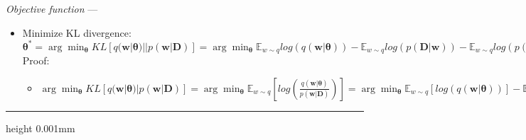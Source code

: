 \emph{Objective function} --- 
\begin{itemize}
    \item Minimize KL divergence: $\boldsymbol{\theta}^* = \arg\min_{\boldsymbol{\theta}} KL [ q(\boldsymbol{w}|\boldsymbol{\theta}) || p(\boldsymbol{w}|\boldsymbol{D}) ] = \arg\min_{\boldsymbol{\theta}} \mathbb{E}_{w \sim q} log (q(\boldsymbol{w}|\boldsymbol{\theta})) - \mathbb{E}_{w \sim q} log (p(\boldsymbol{D}|\boldsymbol{w})) - \mathbb{E}_{w \sim q} log (p(\boldsymbol{w}))$\\
    Proof:
    \begin{itemize}
        \item $\arg\min_{\boldsymbol{\theta}} KL [ q(\boldsymbol{w}|\boldsymbol{\theta}) | p(\boldsymbol{w}|\boldsymbol{D}) ] = \arg\min_{\boldsymbol{\theta}} \mathbb{E}_{w \sim q} [ log( \frac{q(\boldsymbol{w}|\boldsymbol{\theta})}{p(\boldsymbol{w}|\boldsymbol{D})} ) ] = \arg\min_{\boldsymbol{\theta}} \mathbb{E}_{w \sim q}[log( q(\boldsymbol{w}|\boldsymbol{\theta}) )] - \mathbb{E}_{w \sim q}[log( p(\boldsymbol{w}|\boldsymbol{D}) )] = \arg\min_{\boldsymbol{\theta}} \mathbb{E}_{w \sim q}[log( q(\boldsymbol{w}|\boldsymbol{\theta}) )] - \mathbb{E}_{w \sim q}[ \frac{p(\boldsymbol{D}|\boldsymbol{w}) \times p(\boldsymbol{w})}{ p(\boldsymbol{D}) } ] = \arg\min_{\boldsymbol{\theta}} \mathbb{E}_{w \sim q}log( q(\boldsymbol{w}|\boldsymbol{\theta}) ) - \mathbb{E}_{w \sim q} log (p(\boldsymbol{D}|\boldsymbol{w})) - \mathbb{E}_{w \sim q} log (p(\boldsymbol{w})) + \mathbb{E}_{w \sim q} log (p(\boldsymbol{D})) = \arg\min_{\boldsymbol{\theta}} \mathbb{E}_{w \sim q}log( q(\boldsymbol{w}|\boldsymbol{\theta}) ) - \mathbb{E}_{w \sim q} log (p(\boldsymbol{D}|\boldsymbol{w})) - \mathbb{E}_{w \sim q} log (p(\boldsymbol{w})) + \textrm{const.}$
    \end{itemize}
\end{itemize}

{\color{lightgray}\hrule height 0.001mm}

